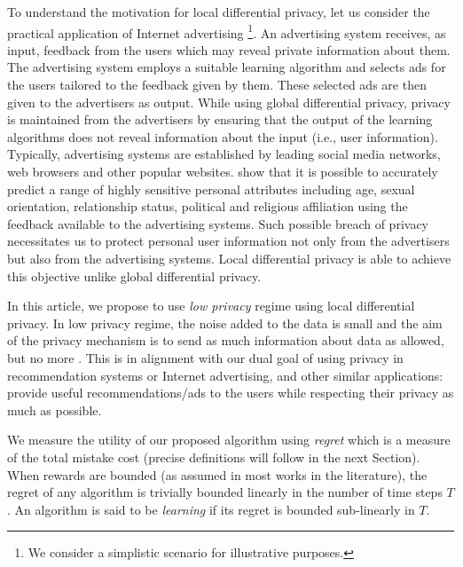 \documentclass[letterpaper]{article} %
\begin{document}
To understand the motivation for local differential privacy, let us consider the practical application of Internet advertising \footnote{We consider a simplistic scenario for illustrative purposes.}. An advertising system receives, as input, feedback from the users which may reveal private information about them. The advertising system employs a suitable learning algorithm and selects ads for the users tailored to the feedback given by them. These selected ads are then given to the advertisers as output.
While using global differential privacy, privacy is maintained from the advertisers by ensuring that the output of the learning algorithms does not reveal information about the input (i.e., user information). Typically, advertising systems are established by leading social media networks, web browsers and other popular websites. \citet{DBLP:conf/icdm/Korolova10,kosinski2013private} show that it is possible to accurately predict a range of highly sensitive personal attributes including age, sexual orientation, relationship status, political and religious affiliation
using the feedback available to the advertising systems. Such possible breach of privacy necessitates us to protect personal user information not only from the advertisers but also from the advertising systems. Local differential privacy is able to achieve this objective unlike global differential privacy.

In this article, we propose to use \textit{low privacy} regime using local differential privacy.
In low privacy regime, the noise added to the data is small and the aim of the privacy mechanism is to send as much information about data as allowed, but no more \citep{NIPS2014_5392}. This is in alignment with our dual goal of using privacy in recommendation systems or Internet advertising, and other similar applications: provide useful recommendations/ads to the users while respecting their privacy as much as possible.

We measure the utility of our proposed algorithm using \textit{regret} which is a measure of the total mistake cost (precise definitions will follow in the next Section). When rewards are bounded (as assumed in most works in the literature), the regret of any algorithm is trivially bounded linearly in the number of time steps $T$. An algorithm is said to be \textit{learning} if its regret is bounded sub-linearly in $T$.
\end{document}
